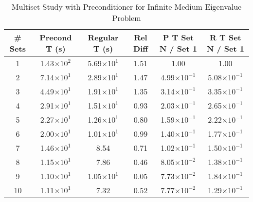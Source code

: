 \begin{table}[!h]
\caption{Multiset Study with Preconditioner for Infinite Medium Eigenvalue Problem}
\begin{center}
\begin{tabular}{c c c c c c}
\hline
\# Sets & Precond T (s) & Regular T (s) & Rel Diff & P T Set N / Set 1 & R T Set N / Set 1 \\[0.5ex]
\hline
1   & 1.43$\times 10^{2}$ & 5.69$\times 10^{1}$ & 1.51 & 1.00                                & 1.00 \\
2   & 7.14$\times 10^{1}$ & 2.89$\times 10^{1}$ & 1.47 & 4.99$\times 10^{-1}$  & 5.08$\times 10^{-1}$ \\
3   & 4.49$\times 10^{1}$ & 1.91$\times 10^{1}$ & 1.35 & 3.14$\times 10^{-1}$  & 3.35$\times 10^{-1}$ \\ 
4   & 2.91$\times 10^{1}$ & 1.51$\times 10^{1}$ & 0.93 & 2.03$\times 10^{-1}$  & 2.65$\times 10^{-1}$ \\
5   & 2.27$\times 10^{1}$ & 1.26$\times 10^{1}$ & 0.80 & 1.59$\times 10^{-1}$  & 2.22$\times 10^{-1}$ \\
6   & 2.00$\times 10^{1}$ & 1.01$\times 10^{1}$ & 0.99 & 1.40$\times 10^{-1}$  & 1.77$\times 10^{-1}$ \\
7   & 1.46$\times 10^{1}$ & 8.54                             & 0.71 & 1.02$\times 10^{-1}$  & 1.50$\times 10^{-1}$ \\
8   & 1.15$\times 10^{1}$ & 7.86                             & 0.46 & 8.05$\times 10^{-2}$  & 1.38$\times 10^{-1}$ \\
9   & 1.10$\times 10^{1}$ & 1.05$\times 10^{1}$ & 0.05 & 7.73$\times 10^{-2}$  & 1.84$\times 10^{-1}$ \\
10 & 1.11$\times 10^{1}$ & 7.32                             & 0.52 & 7.77$\times 10^{-2}$  & 1.29$\times 10^{-1}$ \\
\hline 
\end{tabular} 
\end{center}
\label{table:impi multisets}
\end{table}